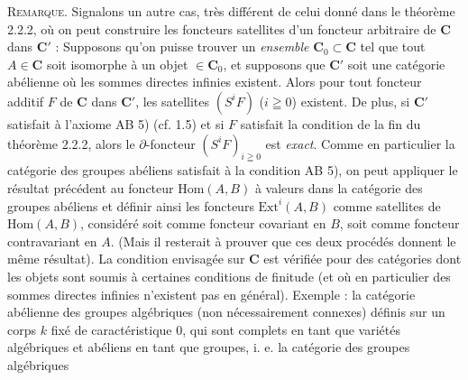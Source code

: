\indent\textsc{Remarque.} Signalons un autre cas, très différent de celui
donné dans le théorème 2.2.2, où on peut construire les foncteurs satellites
d'un foncteur arbitraire de $\mathbf{C}$ dans $\mathbf{C}'$ : Supposons qu'on puisse trouver un
\textit{ensemble} $\mathbf{C}_0\subset \mathbf{C}$ tel que tout $A\in \mathbf{C}$ soit isomorphe à un objet
$\in \mathbf{C}_0$, et supposons que $\mathbf{C}'$ soit une catégorie abélienne où les sommes
directes infinies existent. Alors pour tout foncteur additif $F$ de $\mathbf{C}$ dans
$\mathbf{C}'$, les satellites $(S^iF)$ ($i\geqq0$) existent. De plus, si $\mathbf{C}'$ satisfait
à l'axiome AB 5) (cf. 1.5) et si $F$ satisfait la condition de la fin du
théorème 2.2.2, alors le $\partial$-foncteur $(S^iF)_{i\geqq0}$ est \textit{exact}. Comme
en particulier la catégorie des groupes abéliens satisfait à la condition
AB 5), on peut appliquer le résultat précédent au foncteur
$\mathrm{Hom}(A,B)$ à valeurs dans la catégorie des groupes abéliens et
définir ainsi les foncteurs $\mathrm{Ext}^i(A,B)$ comme satellites de
$\mathrm{Hom}(A,B)$, considéré soit comme foncteur covariant en $B$, soit
comme foncteur contravariant en $A$. (Mais il resterait à prouver que ces deux
procédés donnent le même résultat). La condition envisagée sur $\mathbf{C}$ est
vérifiée pour des catégories dont les objets sont soumis à certaines
conditions de finitude (et où en particulier des sommes directes infinies
n'existent pas en général). Exemple : la catégorie abélienne des groupes
algébriques (non nécessairement connexes) définis sur un corps $k$ fixé de
caractéristique 0, qui sont complets en tant que variétés algébriques et
abéliens en tant que groupes, i. e. la catégorie des groupes algébriques

